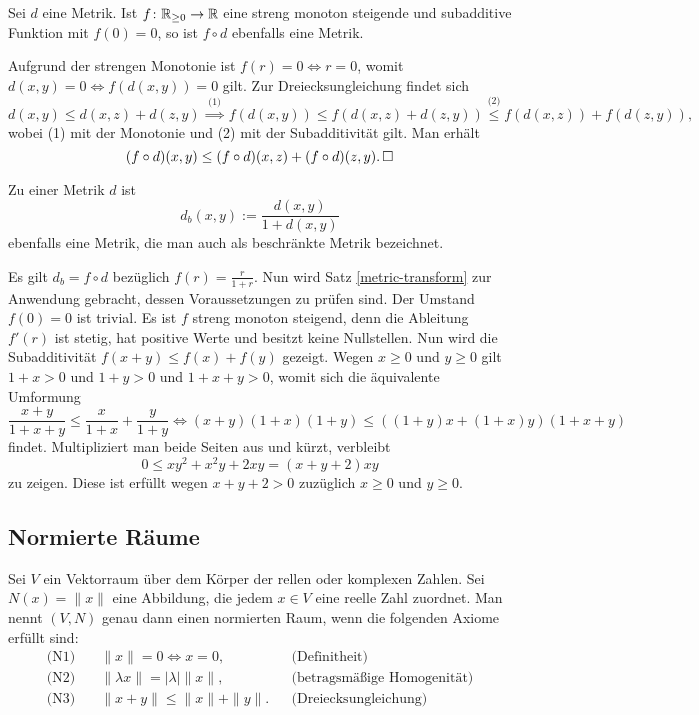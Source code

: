 \begin{Satz}\label{metric-transform}
Sei $d$ eine Metrik. Ist $f\colon\mathbb R_{\ge 0}\to\mathbb R$ eine streng monoton
steigende und subadditive Funktion mit $f(0)=0$, so ist $f\circ d$
ebenfalls eine Metrik.
\end{Satz}
\begin{Beweis}
Aufgrund der strengen Monotonie ist $f(r)=0\Leftrightarrow r = 0$,
womit $d(x,y)=0\Leftrightarrow f(d(x,y))=0$ gilt. Zur
Dreiecksungleichung findet sich
\[d(x,y) \le d(x,z) + d(z,y)
\stackrel{\text{(1)}}\implies f(d(x,y))\le f(d(x,z) + d(z,y))
\stackrel{\text{(2)}}\le f(d(x,z)) + f(d(z,y)),\]
wobei (1) mit der Monotonie und (2) mit der Subadditivität
gilt. Man erhält
\[(f\circ d)(x,y)\le (f\circ d)(x,z) + (f\circ d)(z,y).\,\square\]
\end{Beweis}

\begin{Satz}
Zu einer Metrik $d$ ist
\[d_b(x,y) := \frac{d(x,y)}{1+d(x,y)}\]
ebenfalls eine Metrik, die man auch als beschränkte Metrik bezeichnet.
\end{Satz}
\begin{Beweis}
Es gilt $d_b = f\circ d$ bezüglich $f(r) = \frac{r}{1+r}$.
Nun wird Satz \ref{metric-transform} zur Anwendung gebracht, dessen
Voraussetzungen zu prüfen sind. Der Umstand
$f(0)=0$ ist trivial. Es ist $f$ streng monoton steigend, denn
die Ableitung $f'(r)$ ist stetig, hat positive Werte und besitzt keine
Nullstellen. Nun wird die Subadditivität $f(x+y)\le f(x)+f(y)$ gezeigt.
Wegen $x\ge 0$ und $y\ge 0$ gilt $1+x>0$ und $1+y>0$ und
$1+x+y>0$, womit sich die äquivalente Umformung
\[\frac{x+y}{1+x+y} \le \frac{x}{1+x} + \frac{y}{1+y}
\Leftrightarrow (x+y)(1+x)(1+y) \le ((1+y)x + (1+x)y)(1+x+y)\]
findet. Multipliziert man beide Seiten aus und kürzt, verbleibt
\[0\le xy^2 + x^2 y + 2xy = (x+y+2)xy\]
zu zeigen. Diese ist erfüllt wegen $x+y+2>0$ zuzüglich $x\ge 0$ und
$y\ge 0$.\,\qedsymbol
\end{Beweis}

\newpage
\subsection{Normierte Räume}
\begin{Definition}%
\label{def:normed-space}
Sei $V$ ein Vektorraum über dem Körper der rellen oder komplexen
Zahlen. Sei $N(x)=\|x\|$ eine Abbildung, die jedem $x\in V$ eine
reelle Zahl zuordnet. Man nennt $(V,N)$ genau dann einen
normierten Raum, wenn die folgenden Axiome erfüllt sind:
\begin{align*}
\text{(N1)}\quad &\|x\|=0\iff x=0,&&\text{(Definitheit)}\\
\text{(N2)}\quad &\|\lambda x\|=|\lambda|\|x\|,&&\text{(betragsmäßige Homogenität)}\\
\text{(N3)}\quad &\|x+y\| \le \|x\|+\|y\|.&&\text{(Dreiecksungleichung)}
\end{align*}
\end{Definition}

